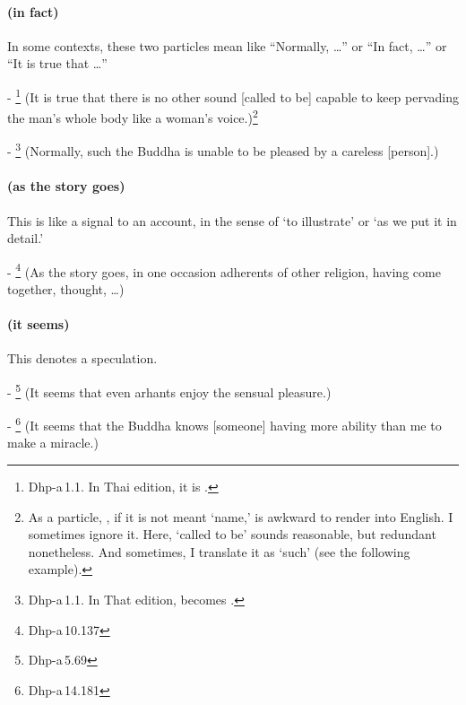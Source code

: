 \paragraph*{ (in fact)} In some contexts, these two particles mean like ``Normally, \ldots'' or ``In fact, \ldots'' or ``It is true that \ldots''\par
- \footnote{Dhp-a\,1.1. In Thai edition, it is .} (It is true that there is no other sound [called to be] capable to keep pervading the man's whole body like a woman's voice.)\footnote{As a particle, , if it is not meant `name,' is awkward to render into English. I sometimes ignore it. Here, `called to be' sounds reasonable, but redundant nonetheless. And sometimes, I translate it as `such' (see the following example).}\par
- \footnote{Dhp-a\,1.1. In That edition,  becomes .} (Normally, such the Buddha is unable to be pleased by a careless [person].)\par

\paragraph*{ (as the story goes)} This is like a signal to an account, in the sense of `to illustrate' or `as we put it in detail.'\par
- \footnote{Dhp-a\,10.137} (As the story goes, in one occasion adherents of other religion, having come together, thought, \ldots)\par

\paragraph*{ (it seems)} This denotes a speculation.\par
- \footnote{Dhp-a\,5.69} (It seems that even arhants enjoy the sensual pleasure.)\par
- \footnote{Dhp-a\,14.181} (It seems that the Buddha knows [someone] having more ability than me to make a miracle.)\par

